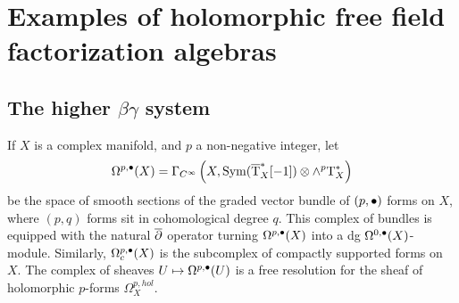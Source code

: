 \documentclass[11pt]{amsart}
\begin{document}
%
%
%
%
%
%
%

\section{Examples of holomorphic free field factorization algebras}
\subsection{The higher $\beta\gamma$ system}

If $X$ is a complex manifold, and $p$ a non-negative integer, let
\begin{equation}
\Omega^{p,\bullet}(X) = \Gamma_{C^\infty}\left(X, \operatorname{Sym}(\overline {{\rm T}}^*_X [-1]) \otimes \wedge^p {\rm T}^*_X\right)
\end{equation}
be the space of smooth sections of the graded vector bundle of $(p,\bullet)$ forms on $X$, where $(p,q)$ forms sit in cohomological degree $q$.
This complex of bundles is equipped with the natural $\overline{\partial}$ operator turning $\Omega^{p,\bullet}(X)$ into a dg $\Omega^{0,\bullet}(X)$-module.
Similarly, $\Omega_{c}^{p,\bullet}(X)$ is the subcomplex of compactly supported forms on $X$.
The complex of sheaves $U \mapsto \Omega^{p,\bullet}(U)$ is a free resolution for the sheaf of holomorphic $p$-forms $\Omega^{p,hol}_{X}$.
\end{document}
